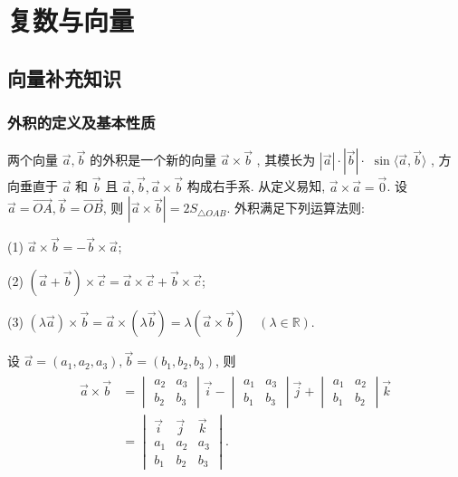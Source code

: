 \chapter{复数与向量}

\section{向量补充知识}
\subsection{外积的定义及基本性质}
两个向量 $\vec{a} , \vec{b}$ 的外积是一个新的向量 $\vec{a} \times \vec{b}$ , 其模长为 $|\vec{a}| \cdot|\vec{b}| \cdot$ $\sin \langle\vec{a}, \vec{b}\rangle$ , 方向垂直于 $\vec{a}$ 和 $\vec{b}$ 且 $\vec{a} , \vec{b} , \vec{a} \times \vec{b}$ 构成右手系.
从定义易知, $\vec{a} \times \vec{a}=\overrightarrow{0}$. 设 $\vec{a}=\overrightarrow{O A}, \vec{b}=\overrightarrow{O B}$, 则 $|\vec{a} \times \vec{b}|=2 S_{\triangle O A B}$.
外积满足下列运算法则:

(1) $\vec{a} \times \vec{b}=-\vec{b} \times \vec{a}$;

(2) $(\vec{a}+\vec{b}) \times \vec{c}=\vec{a} \times \vec{c}+\vec{b} \times \vec{c}$;

(3) $(\lambda \vec{a}) \times \vec{b}=\vec{a} \times(\lambda \vec{b})=\lambda(\vec{a} \times \vec{b}) \quad(\lambda \in \mathbb{R})$.

设 $\vec{a}=\left(a_1, a_2, a_3\right), \vec{b}=\left(b_1, b_2, b_3\right)$, 则
\begin{align*}
	\begin{aligned}
		\vec{a} \times \vec{b} & =\begin{vmatrix}
			                          a_2 & a_3 \\
			                          b_2 & b_3
		                          \end{vmatrix} \vec{i}-\begin{vmatrix}
			                                                a_1 & a_3 \\
			                                                b_1 & b_3
		                                                \end{vmatrix} \vec{j}+\begin{vmatrix}
			                                                                      a_1 & a_2 \\
			                                                                      b_1 & b_2
		                                                                      \end{vmatrix} \vec{k} \\
		                       & =\begin{vmatrix}
			                          \vec{i} & \vec{j} & \vec{k} \\
			                          a_1     & a_2     & a_3     \\
			                          b_1     & b_2     & b_3
		                          \end{vmatrix} .
	\end{aligned}
\end{align*}

